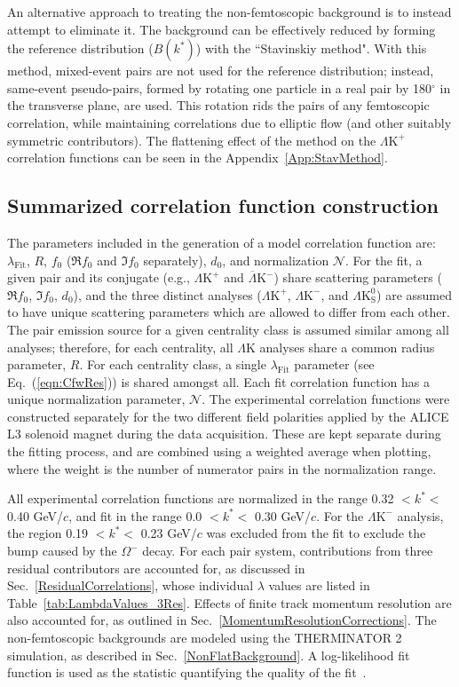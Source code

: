 \documentclass[ALICE,manyauthors]{cernphprep}
\newcommand{\LamK}{$\Lambda$K\xspace}
\newcommand{\LamKchP}{$\Lambda\mathrm{K^{+}}$\xspace}
\newcommand{\ALamKchM}{$\overline{\Lambda}\mathrm{K^{-}}$\xspace}
\newcommand{\LamKchM}{$\Lambda\mathrm{K^{-}}$\xspace}
\newcommand{\LamKs}{$\Lambda\mathrm{K^{0}_{S}}$\xspace}
\begin{document}
An alternative approach to treating the non-femtoscopic background is to instead attempt to eliminate it.
The background can be effectively reduced by forming the reference distribution ($B(k^{*})$) with the ``Stavinskiy method".
With this method, mixed-event pairs are not used for the reference distribution; instead, same-event pseudo-pairs, formed by rotating one particle in a real pair by 180$^\circ$ in the transverse plane, are used.  
This rotation rids the pairs of any femtoscopic correlation, while maintaining correlations due to elliptic flow (and other suitably symmetric contributors).
The flattening effect of the method on the \LamKchP correlation functions can be seen in the Appendix~\ref{App:StavMethod}.

\subsection{Summarized correlation function construction}
\label{SummarizedFitProcedure}

The parameters included in the generation of a model correlation function are: $\lambda_{\mathrm{Fit}}$, $R$, $f_{0}$ ($\Re f_{0}$ and $\Im f_{0}$ separately), $d_{0}$, and normalization $\mathcal{N}$.
For the fit, a given pair and its conjugate (e.g., \LamKchP and \ALamKchM) share scattering parameters ($\Re f_{0}$, $\Im f_{0}$, $d_{0}$), and the three distinct analyses (\LamKchP, \LamKchM, and \LamKs) are assumed to have unique scattering parameters which are
allowed to differ from each other.
The pair emission source for a given centrality class is assumed similar among all analyses; therefore, for each centrality, all \LamK analyses share a common radius parameter, $R$.
For each centrality class, a single $\lambda_{\mathrm{Fit}}$ parameter (see Eq.~(\ref{eqn:CfwRes})) is shared amongst all.
Each fit correlation function has a unique normalization parameter, $\mathcal{N}$.
The experimental correlation functions were constructed separately for the two different field polarities applied by the ALICE L3 solenoid magnet during the data acquisition.
These are kept separate during the fitting process, and are combined using a weighted average when plotting, where the weight is the number of numerator pairs in the normalization range.

All experimental correlation functions are normalized in the range 0.32 $< k^{*} <$ 0.40 GeV/$c$, and fit in the range 0.0 $< k^{*} <$ 0.30 GeV/$c$.
For the \LamKchM analysis, the region 0.19 $< k^{*} <$ 0.23 GeV/$c$ was excluded from the fit to exclude the bump caused by the $\Omega^{-}$ decay.
For each pair system, contributions from three residual contributors are accounted for, as discussed in Sec.~\ref{ResidualCorrelations}, whose individual $\lambda$ values are listed in Table~\ref{tab:LambdaValues_3Res}.
Effects of finite track momentum resolution are also accounted for, as outlined in Sec.~\ref{MomentumResolutionCorrections}.
The non-femtoscopic backgrounds are modeled using the THERMINATOR 2 simulation, as described in Sec.~\ref{NonFlatBackground}.
A log-likelihood fit function is used as the statistic quantifying the quality of the fit~\cite{Lisa:2005dd}.
\end{document}
